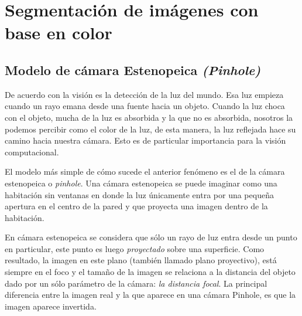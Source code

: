 \documentclass{book}
\begin{document}
\chapter{ Segmentación de imágenes con base en color}
\section{Modelo de cámara Estenopeica \textit{(Pinhole)}}
De acuerdo con \cite{bradski2008learning} la visión es la detección de la luz del mundo. Esa luz empieza cuando un rayo emana desde una fuente hacia un objeto. Cuando la luz choca con el objeto, mucha de la luz es absorbida y la que no es absorbida, nosotros la podemos percibir como el color de la luz, de esta manera, la luz reflejada hace su camino hacia nuestra cámara. Esto es de particular importancia para la visión computacional.

El modelo más simple de cómo sucede el anterior fenómeno es el de la cámara estenopeica o \textit{pinhole}. Una cámara estenopeica se puede imaginar como una habitación sin ventanas en donde la luz únicamente entra por una pequeña apertura en el centro de la pared y que proyecta una imagen dentro de la habitación.

En cámara estenopeica se considera que sólo un rayo de luz entra desde un punto en particular, este punto es luego \textit{proyectado} sobre una superficie. Como resultado, la imagen en este plano (también llamado plano proyectivo), está siempre en el foco y el tamaño de la imagen se relaciona a la distancia del objeto dado por un sólo parámetro de la cámara: \textit{la distancia focal}. La principal diferencia entre la imagen real y la que aparece en una cámara Pinhole, es que la imagen aparece invertida. 
	
\end{document}
